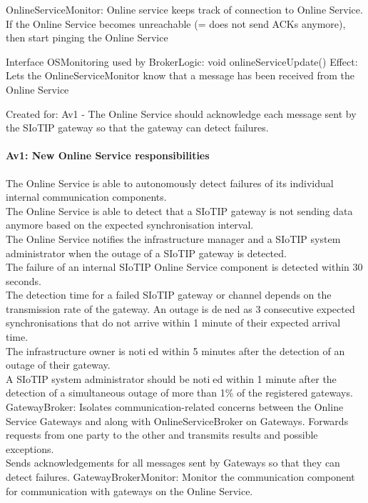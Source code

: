             OnlineServiceMonitor:
                Online service keeps track of connection to Online Service.
                If the Online Service becomes unreachable (= does not send ACKs anymore), then start pinging the Online Service

                Interface OSMonitoring used by BrokerLogic:
                    void onlineServiceUpdate()
                        Effect: Lets the OnlineServiceMonitor know that a message has been received from the Online Service
                        \item Created for: Av1 - The Online Service should acknowledge each message sent by the SIoTIP gateway so that the gateway can detect failures.


    \paragraph{Av1: New Online Service responsibilities}
        The Online Service is able to autonomously detect failures of its individual internal communication components.\\
        The Online Service is able to detect that a SIoTIP gateway is not sending data anymore based on the expected synchronisation interval.\\
        The Online Service notifies the infrastructure manager and a SIoTIP system administrator when the outage of a SIoTIP gateway is detected.\\
        The failure of an internal SIoTIP Online Service component is detected within 30 seconds.\\
        The detection time for a failed SIoTIP gateway or channel depends on the transmission rate
        of the gateway. An outage is dened as 3 consecutive expected synchronisations that do not
        arrive within 1 minute of their expected arrival time.\\
        The infrastructure owner is notied within 5 minutes after the detection of an outage of their gateway.\\
        A SIoTIP system administrator should be notied within 1 minute after the detection
        of a simultaneous outage of more than 1\% of the registered gateways.\\

        GatewayBroker: Isolates communication-related concerns between the Online Service Gateways and along with OnlineServiceBroker on Gateways.
                       Forwards requests from one party to the other and transmits results and possible exceptions. \\
                       Sends acknowledgements for all messages sent by Gateways so that they can detect failures.
        GatewayBrokerMonitor: Monitor the communication component for communication with gateways on the Online Service.

